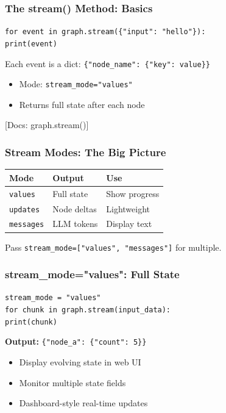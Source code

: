 \documentclass[aspectratio=169,11pt]{beamer}
\newcommand{\docref}[1]{{\scriptsize\color{docgray}[Docs: #1]}}
\begin{document}
\begin{frame}
\frametitle{The stream() Method: Basics}
\begin{tipbox}
\texttt{for event in graph.stream(\{"input": "hello"\}):}\\
\quad\texttt{print(event)}
\end{tipbox}
\vspace{0.1cm}
\begin{tipbox}
Each event is a dict: \texttt{\{"node\_name": \{"key": value\}\}}
\end{tipbox}
\vspace{0.1cm}
\begin{warningbox}[Default]
\setlength{\itemsep}{1pt}
\begin{itemize}
\item Mode: \texttt{stream\_mode="values"}
\item Returns full state after each node
\end{itemize}
\end{warningbox}
\docref{graph.stream()}
\end{frame}

\begin{frame}
\frametitle{Stream Modes: The Big Picture}
\begin{center}
\begin{tabular}{lll}
\toprule
\textbf{Mode} & \textbf{Output} & \textbf{Use} \\
\midrule
\texttt{values} & Full state & Show progress \\
\texttt{updates} & Node deltas & Lightweight \\
\texttt{messages} & LLM tokens & Display text \\
\toprule
\end{tabular}
\end{center}
\vspace{0.1cm}
\begin{conceptbox}[Combine]
Pass \texttt{stream\_mode=["values", "messages"]} for multiple.
\end{conceptbox}
\end{frame}

\begin{frame}
\frametitle{stream\_mode="values": Full State}
\begin{tipbox}[Example]
\texttt{stream\_mode = "values"}\\
\texttt{for chunk in graph.stream(input\_data):}\\
\quad\texttt{print(chunk)}
\end{tipbox}
\vspace{0.1cm}
\textbf{Output:} \texttt{\{"node\_a": \{"count": 5\}\}}
\vspace{0.1cm}
\begin{tipbox}
\setlength{\itemsep}{1pt}
\begin{itemize}
\item Display evolving state in web UI
\item Monitor multiple state fields
\item Dashboard-style real-time updates
\end{itemize}
\end{tipbox}
\end{frame}
\end{document}
